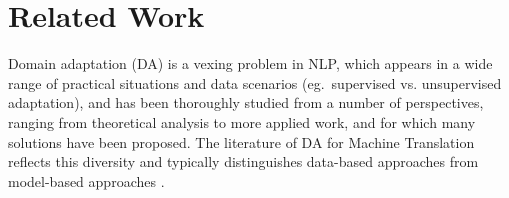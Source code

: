 \documentclass[11pt,a4paper]{article}
\newcommand{\fyTodo}[1]{\Todo[FY:]{\textcolor{orange}{#1}}}
\newcommand{\fyDone}[1]{\done[FY]\Todo[FY:]{\textcolor{orange}{#1}}}
\begin{document}
\section{Related Work \label{sec:related_work}}
\fyDone{Add standard labels to sections}
\fyDone{Related work goes last}
\fyTodo{Compare also to Peng 2017}



Domain adaptation (DA) is a vexing problem in NLP, which appears in a wide range of practical situations and data scenarios (eg.\ supervised vs. unsupervised adaptation), and  has been thoroughly  studied from a number of perspectives, ranging from theoretical analysis to more applied work, and for which many solutions have been proposed. The literature of DA for Machine Translation reflects this diversity and typically distinguishes data-based approaches from model-based approaches \cite{Chu2017comparison,Chu18asurvey}.
\end{document}
